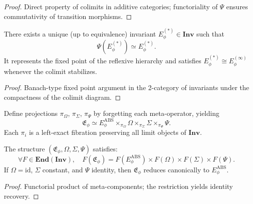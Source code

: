 \begin{proof}
Direct property of colimits in additive categories; functoriality of $\Psi$ ensures commutativity of transition morphisms. \relax
\end{proof}

\begin{theorem}\label{thm:reflexive-fixed}
There exists a unique (up to equivalence) invariant 
$E_\phi^{(\ast)}\in\mathbf{Inv}$ such that
\[
\Psi(E_\phi^{(\ast)})\simeq E_\phi^{(\ast)}.
\]
It represents the fixed point of the reflexive hierarchy and satisfies 
$E_\phi^{(\ast)}\cong E_\phi^{(\infty)}$ whenever the colimit stabilizes.
\end{theorem}

\begin{proof}
Banach-type fixed point argument in the 2-category of invariants under the compactness of the colimit diagram. \relax
\end{proof}


\begin{definition}\label{def:meta-projection}
Define projections $\pi_\Omega$, $\pi_\Sigma$, $\pi_\Psi$ by forgetting each meta-operator, yielding
\[
\mathfrak E_\phi
\simeq
E_\phi^{\mathrm{ABS}}\times_{\pi_\Omega}\Omega
\times_{\pi_\Sigma}\Sigma
\times_{\pi_\Psi}\Psi.
\]
Each $\pi_i$ is a left-exact fibration preserving all limit objects of $\mathbf{Inv}$.
\end{definition}

\begin{theorem}\label{thm:meta-extension}
The structure $(\mathfrak E_\phi,\Omega,\Sigma,\Psi)$ satisfies:
\[
\forall F\in\mathbf{End}(\mathbf{Inv}),\quad
F(\mathfrak E_\phi)
=F(E_\phi^{\mathrm{ABS}})\times
F(\Omega)\times
F(\Sigma)\times
F(\Psi).
\]
If $\Omega=\mathrm{id}$, $\Sigma$ constant, and $\Psi$ identity, 
then $\mathfrak E_\phi$ reduces canonically to $E_\phi^{\mathrm{ABS}}$.
\end{theorem}

\begin{proof}
Functorial product of meta-components; the restriction yields identity recovery. \relax
\end{proof}

